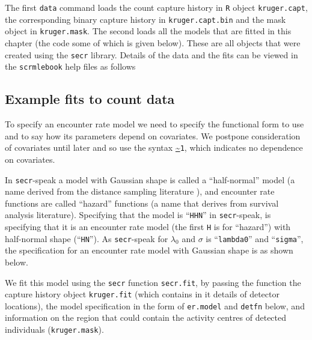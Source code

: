The first \texttt{data} command loads the count capture history in \texttt{R} object \texttt{kruger.capt}, the corresponding binary capture history in \texttt{kruger.capt.bin} and the mask object in \texttt{kruger.mask}. The second loads all the models that are fitted in this chapter (the code some of which is given below). These are all objects that were created using the \texttt{secr} library. Details of the data and the fits can be viewed in the \texttt{scrmlebook} help files as follows
{\small
\begin{knitrout}
\color{fgcolor}\begin{kframe}
\begin{alltt}
\hlstd{(}\hlstd{)}
\hlstd{(}\hlstd{)}
\end{alltt}
\end{kframe}
\end{knitrout}
}

\subsection{Example fits to count data}

To specify an encounter rate model we need to specify the functional form to use and to say how its parameters depend on covariates. We postpone consideration of covariates until later and so use the syntax \url{~}\texttt{1}, which indicates no dependence on covariates.

In \texttt{secr}-speak a model with Gaussian shape is called a ``half-normal'' model (a name derived from the distance sampling literature ), and encounter rate functions are called ``hazard'' functions (a name that derives from survival analysis literature). Specifying that the model is ``\texttt{HHN}'' in \texttt{secr}-speak, is specifying that it is an encounter rate model (the first \texttt{H} is for ``hazard'') with half-normal shape (``\texttt{HN}''). As \texttt{secr}-speak for $\lambda_0$ and $\sigma$ is ``\texttt{lambda0}'' and ``\texttt{sigma}'', the specification for an encounter rate model with Gaussian shape is as shown below.

We fit this model using the \texttt{secr} function \texttt{secr.fit}, by passing the function the capture history object \texttt{kruger.fit} (which contains in it details of detector locations), the model specification in the form of \texttt{er.model} and \texttt{detfn} below, and information on the region that could contain the activity centres of detected individuals (\texttt{kruger.mask}).

